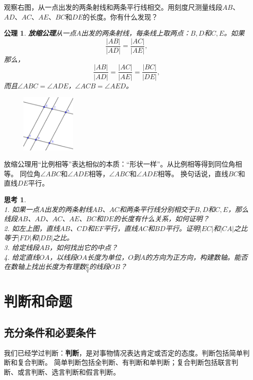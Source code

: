 \documentclass[12pt,UTF8]{ctexbook}
\newtheorem{sk}{思考}[section]
\newtheorem{po}{公理}
\begin{document}
观察右图，从一点出发的两条射线和两条平行线相交。用刻度尺测量线段$AB$、$AD$、$AC$、$AE$、$BC$和$DE$的长度。你有什么发现？
\begin{po}{\textbf{放缩公理}}\label{po:6}
    从一点$A$出发的两条射线，每条线上取两点：$B,D$和$C,E$。如果
    $$ \frac{|AB|}{|AD|} = \frac{|AC|}{|AE|},$$
    那么，
    $$ \frac{|AB|}{|AD|} = \frac{|AC|}{|AE|} = \frac{|BC|}{|DE|},$$
    而且$\angle ABC = \angle ADE$，$\angle ACB = \angle AED$。
\end{po}
\begin{figure} %
    \includegraphics[width=0.24\textwidth]{比例2.png}
\end{figure}

放缩公理用“比例相等”表达相似的本质：“形状一样”。从比例相等得到同位角相等。
同位角$\angle ABC$和$\angle ADE$相等，$\angle ABC$和$\angle ADE$相等。
换句话说，直线$BC$和直线$DE$平行。

\begin{sk}\label{sk:1-2-0}
    \mbox{}\\
    1. 如果一点$A$出发的两条射线$AB$、$AC$和两条平行线分别相交于$B,D$和$C,E$，那么线段$AB$、$AD$、$AC$、$AE$、$BC$和$DE$的长度有什么关系，如何证明？\\
    2. 如左上图，直线$AB$、$CD$和$EF$平行，直线$AC$和$BD$平行。证明$|EC|$和$|CA|$之比等于$|FD|$和$|DB|$之比。\\
    3. 给定线段$AB$，如何找出它的中点？\\
    4. 给定直线$OA$，以线段$OA$长度为单位，$O$到$A$的方向为正方向，构建数轴。能否在数轴上找出长度为有理数$\frac{p}{q}$的线段$OB$？
\end{sk}

\chapter{判断和命题}
\section{充分条件和必要条件}
我们已经学过判断：\textbf{判断}，是对事物情况表达肯定或否定的态度。判断包括简单判断和复合判断。
简单判断包括全判断、有判断和单判断；复合判断包括联言判断、或言判断、选言判断和假言判断。
\end{document}
